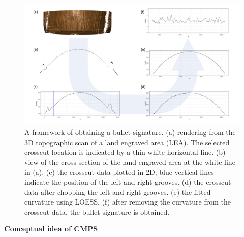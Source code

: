 \begin{figure}

{\centering \includegraphics[width=.9\textwidth]{img/figure1_v2} 

}

\caption{A framework of obtaining a bullet signature. (a) rendering from the 3D topographic scan of a land engraved area (LEA). The selected crosscut location is indicated by a thin white horizontal line. (b) view of the cross-section of the land engraved area at the white line in (a). (c) the crosscut data plotted in 2D; blue vertical lines indicate the position of the left and right grooves. (d) the crosscut data after chopping the left and right grooves. (e) the fitted curvature using LOESS. (f) after removing the curvature from the crosscut data, the bullet signature is obtained.}\label{fig:process}
\end{figure}

\textbf{Conceptual idea of CMPS}

